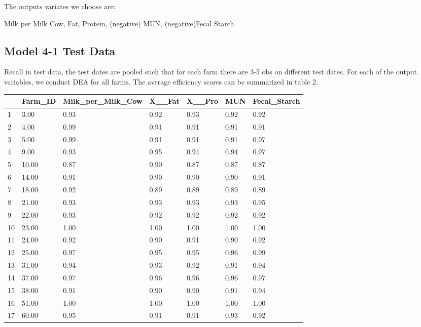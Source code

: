 \documentclass[12pt,]{article}
\begin{document}
The outputs variates we choose are:
\begin{center}
Milk per Milk Cow, Fat, Protein, (negative) MUN, (negative)Fecal Starch
\end{center}



\subsection{Model 4-1 Test Data}
Recall in test data, the test dates are pooled such that for each farm there are 3-5 obs on different test dates. For each of the output variables, we conduct DEA for all farms. The average efficiency scores can be summarized in table 2.

\begin{longtable}{l|l|l|l|l|l|l}
  \hline
 & Farm\_ID & Milk\_per\_Milk\_Cow & X\_\_Fat & X\_\_Pro & MUN & Fecal\_Starch \\ 
  \hline
1 & 3.00 & 0.93 & 0.92 & 0.93 & 0.92 & 0.92 \\ 
  2 & 4.00 & 0.99 & 0.91 & 0.91 & 0.91 & 0.91 \\ 
  3 & 5.00 & 0.99 & 0.91 & 0.91 & 0.91 & 0.97 \\ 
  4 & 9.00 & 0.93 & 0.95 & 0.94 & 0.94 & 0.97 \\ 
  5 & 10.00 & 0.87 & 0.90 & 0.87 & 0.87 & 0.87 \\ 
  6 & 14.00 & 0.91 & 0.90 & 0.90 & 0.90 & 0.91 \\ 
  7 & 18.00 & 0.92 & 0.89 & 0.89 & 0.89 & 0.89 \\ 
  8 & 21.00 & 0.93 & 0.93 & 0.93 & 0.93 & 0.95 \\ 
  9 & 22.00 & 0.93 & 0.92 & 0.92 & 0.92 & 0.92 \\ 
  10 & 23.00 & 1.00 & 1.00 & 1.00 & 1.00 & 1.00 \\ 
  11 & 24.00 & 0.92 & 0.90 & 0.91 & 0.90 & 0.92 \\ 
  12 & 25.00 & 0.97 & 0.95 & 0.95 & 0.96 & 0.99 \\ 
  13 & 31.00 & 0.94 & 0.93 & 0.92 & 0.91 & 0.94 \\ 
  14 & 37.00 & 0.97 & 0.96 & 0.96 & 0.96 & 0.97 \\ 
  15 & 38.00 & 0.91 & 0.90 & 0.90 & 0.91 & 0.94 \\ 
  16 & 51.00 & 1.00 & 1.00 & 1.00 & 1.00 & 1.00 \\ 
  17 & 60.00 & 0.95 & 0.91 & 0.91 & 0.93 & 0.92 \\ 

\end{longtable}
\end{document}
